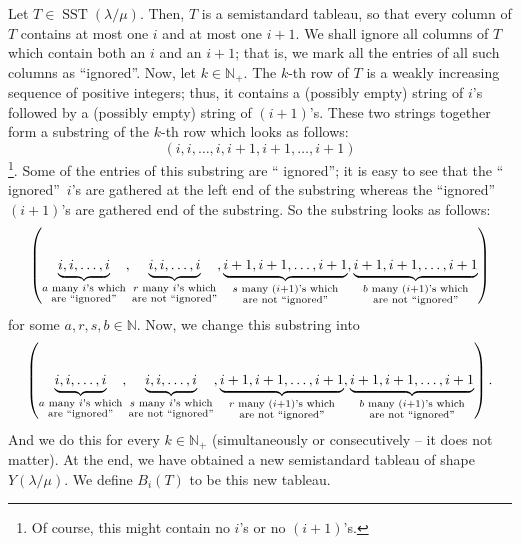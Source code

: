 \documentclass[numbers=enddot,12pt,final,onecolumn,notitlepage]{scrartcl}%
\theoremstyle{definition}
\begin{document}
Let $T\in\operatorname*{SST}\left(  \lambda/\mu\right)  $. Then, $T$ is a
semistandard tableau, so that every column of $T$ contains at most one $i$ and
at most one $i+1$. We shall ignore all columns of $T$ which contain both an
$i$ and an $i+1$; that is, we mark all the entries of all such columns as
\textquotedblleft ignored\textquotedblright. Now, let $k\in\mathbb{N}_{+}$.
The $k$-th row of $T$ is a weakly increasing sequence of positive integers;
thus, it contains a (possibly empty) string of $i$'s followed by a (possibly
empty) string of $\left(  i+1\right)  $'s. These two strings together form a
substring of the $k$-th row which looks as follows:%
\[
\left(  i,i,\ldots,i,i+1,i+1,\ldots,i+1\right)
\]
\footnote{Of course, this might contain no $i$'s or no $\left(  i+1\right)
$'s.}. Some of the entries of this substring are \textquotedblleft
ignored\textquotedblright; it is easy to see that the \textquotedblleft
ignored\textquotedblright\ $i$'s are gathered at the left end of the substring
whereas the \textquotedblleft ignored\textquotedblright\ $\left(  i+1\right)
$'s are gathered end of the substring. So the substring looks as follows:%
\[
\left(  \underbrace{i,i,\ldots,i}_{\substack{a\text{ many }i\text{'s
which}\\\text{are \textquotedblleft ignored\textquotedblright}}%
},\underbrace{i,i,\ldots,i}_{\substack{r\text{ many }i\text{'s which}%
\\\text{are not \textquotedblleft ignored\textquotedblright}}%
},\underbrace{i+1,i+1,\ldots,i+1}_{\substack{s\text{ many }\left(  i+1\right)
\text{'s which}\\\text{are not \textquotedblleft ignored\textquotedblright}%
}},\underbrace{i+1,i+1,\ldots,i+1}_{\substack{b\text{ many }\left(
i+1\right)  \text{'s which}\\\text{are not \textquotedblleft
ignored\textquotedblright}}}\right)
\]
for some $a,r,s,b\in\mathbb{N}$. Now, we change this substring into%
\[
\left(  \underbrace{i,i,\ldots,i}_{\substack{a\text{ many }i\text{'s
which}\\\text{are \textquotedblleft ignored\textquotedblright}}%
},\underbrace{i,i,\ldots,i}_{\substack{s\text{ many }i\text{'s which}%
\\\text{are not \textquotedblleft ignored\textquotedblright}}%
},\underbrace{i+1,i+1,\ldots,i+1}_{\substack{r\text{ many }\left(  i+1\right)
\text{'s which}\\\text{are not \textquotedblleft ignored\textquotedblright}%
}},\underbrace{i+1,i+1,\ldots,i+1}_{\substack{b\text{ many }\left(
i+1\right)  \text{'s which}\\\text{are not \textquotedblleft
ignored\textquotedblright}}}\right)  .
\]
And we do this for every $k\in\mathbb{N}_{+}$ (simultaneously or consecutively
-- it does not matter). At the end, we have obtained a new semistandard
tableau of shape $Y\left(  \lambda/\mu\right)  $. We define $B_{i}\left(
T\right)  $ to be this new tableau.
\end{document}
